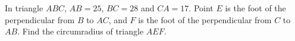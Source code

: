 In triangle $ABC$, $AB=25$, $BC=28$ and $CA=17$. Point $E$ is the foot of the perpendicular from $B$ to $AC$, and $F$ is the foot of the perpendicular from $C$ to $AB$. Find the circumradius of triangle $AEF$.
